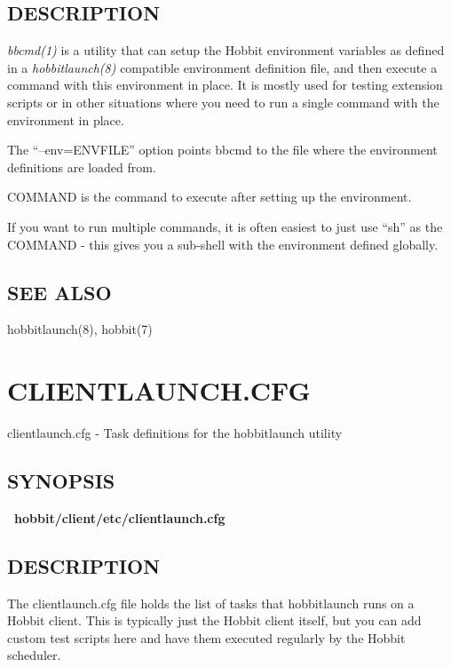  
\subsection{DESCRIPTION}
\emph{bbcmd(1)} is a utility that can setup the Hobbit environment
variables as defined in a \emph{hobbitlaunch(8)} compatible
environment definition file, and then execute a command with this
environment in place. It is mostly used for testing extension scripts
or in other situations where you need to run a single command with the
environment in place. 


The ``--env=ENVFILE'' option points bbcmd to the file where the
environment definitions are loaded from. 



COMMAND is the command to execute after setting up the environment. 

If you want to run multiple commands, it is often easiest to just use
``sh'' as the COMMAND - this gives you a sub-shell with the
environment defined globally. 

\subsection{SEE ALSO} hobbitlaunch(8), hobbit(7) 



%
\newpage
\section{CLIENTLAUNCH.CFG}
 clientlaunch.cfg - Task definitions for the hobbitlaunch utility 

 
\subsection{SYNOPSIS}
\textbf{~hobbit/client/etc/clientlaunch.cfg}


 
\subsection{DESCRIPTION}
 The clientlaunch.cfg file holds the list of tasks that hobbitlaunch
 runs on a Hobbit client. This is typically just the Hobbit client
 itself, but you can add custom test scripts here and have them
 executed regularly by the Hobbit scheduler. 


